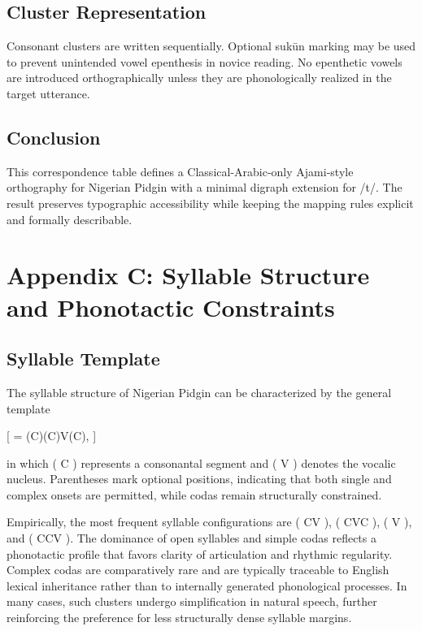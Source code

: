 \documentclass[12pt]{article}
\begin{document}
\subsection{Cluster Representation}

Consonant clusters are written sequentially. Optional suk\=un marking may be used to prevent unintended vowel epenthesis in novice reading. No epenthetic vowels are introduced orthographically unless they are phonologically realized in the target utterance.

\subsection{Conclusion}

This correspondence table defines a Classical-Arabic-only Ajami-style orthography for Nigerian Pidgin with a minimal digraph extension for /t\textipa{\textesh}/. The result preserves typographic accessibility while keeping the mapping rules explicit and formally describable.

\section{Appendix C: Syllable Structure and Phonotactic Constraints}

\subsection{Syllable Template}

The syllable structure of Nigerian Pidgin can be characterized by the general template

[
\sigma = (C)(C)V(C),
]

in which ( C ) represents a consonantal segment and ( V ) denotes the vocalic nucleus. Parentheses mark optional positions, indicating that both single and complex onsets are permitted, while codas remain structurally constrained.

Empirically, the most frequent syllable configurations are ( CV ), ( CVC ), ( V ), and ( CCV ). The dominance of open syllables and simple codas reflects a phonotactic profile that favors clarity of articulation and rhythmic regularity. Complex codas are comparatively rare and are typically traceable to English lexical inheritance rather than to internally generated phonological processes. In many cases, such clusters undergo simplification in natural speech, further reinforcing the preference for less structurally dense syllable margins.
\end{document}
